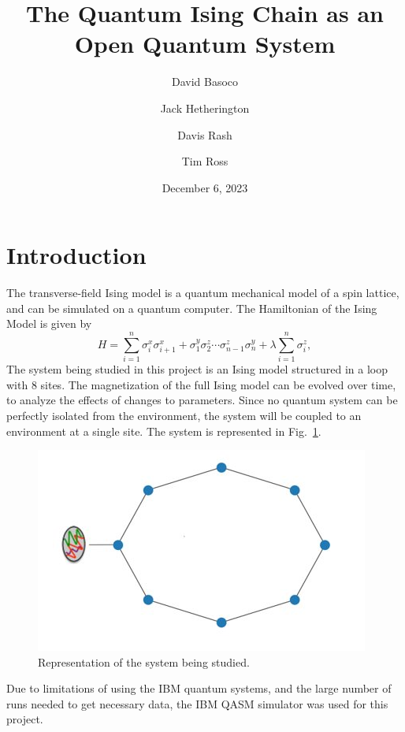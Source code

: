 \documentclass[12pt, twocolumn]{article}
\title{The Quantum Ising Chain as an Open Quantum System}
\author{David Basoco \and Jack Hetherington \and Davis Rash \and Tim Ross}
\date{December 6, 2023}
\begin{document}
  \maketitle

  \section{Introduction}

  The transverse-field Ising model is a quantum mechanical model of a spin lattice, and can be simulated on a quantum computer. The Hamiltonian of the Ising Model is given by
  \begin{equation}
    \label{eq:hamiltonian}
    H = \sum_{i = 1}^{n} \sigma_{i}^{x} \sigma_{i + 1}^{x}
        + \sigma_{1}^{y} \sigma_{2}^{z} \dotsm \sigma_{n - 1}^{z} \sigma_{n}^{y}
        + \lambda \sum_{i = 1}^{n} \sigma_{i}^{z},
  \end{equation}
  The system being studied in this project is an Ising model structured in a loop with 8 sites.
  The magnetization of the full Ising model can be evolved over time, to analyze the effects of changes to parameters. Since no quantum system can be perfectly isolated from the environment, the system will be coupled to an environment at a single site. The system is represented in Fig.~\ref{fig:SystemDiagram}.
  \begin{figure}[!htb]
    \centering
    \includegraphics[width=\columnwidth]{images/SystemDiagram.png}
    \caption{Representation of the system being studied.%
      \label{fig:SystemDiagram}}
  \end{figure}
  Due to limitations of using the IBM quantum systems, and the large number of runs needed to get necessary data, the IBM QASM simulator was used for this project.
\end{document}
